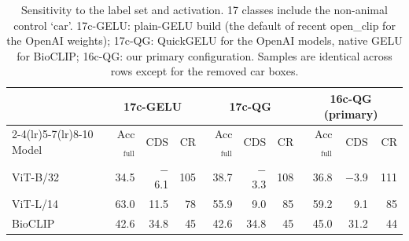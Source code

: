 \begin{table}[t]
\caption{Sensitivity to the label set and activation. 17 classes include the non-animal control `car'. 17c-GELU: plain-GELU build (the default of recent open\_clip for the OpenAI weights); 17c-QG: QuickGELU for the OpenAI models, native GELU for BioCLIP; 16c-QG: our primary configuration. Samples are identical across rows except for the removed car boxes.}
\label{tab:17class}
\centering\footnotesize
\setlength{\tabcolsep}{4pt}
\begin{tabular}{l rrr rrr rrr}
\toprule
 & \multicolumn{3}{c}{17c-GELU} & \multicolumn{3}{c}{17c-QG} & \multicolumn{3}{c}{16c-QG (primary)}\\
\cmidrule(lr){2-4}\cmidrule(lr){5-7}\cmidrule(lr){8-10}
Model & Acc$_\text{full}$ & CDS & CR & Acc$_\text{full}$ & CDS & CR & Acc$_\text{full}$ & CDS & CR \\
\midrule
ViT-B/32 & 34.5 & $-$6.1 & 105 & 38.7 & $-$3.3 & 108 & 36.8 & $-$3.9 & 111 \\
ViT-L/14 & 63.0 & 11.5 & 78 & 55.9 & 9.0 & 85 & 59.2 & 9.1 & 85 \\
BioCLIP & 42.6 & 34.8 & 45 & 42.6 & 34.8 & 45 & 45.0 & 31.2 & 44 \\
\bottomrule
\end{tabular}
\end{table}
